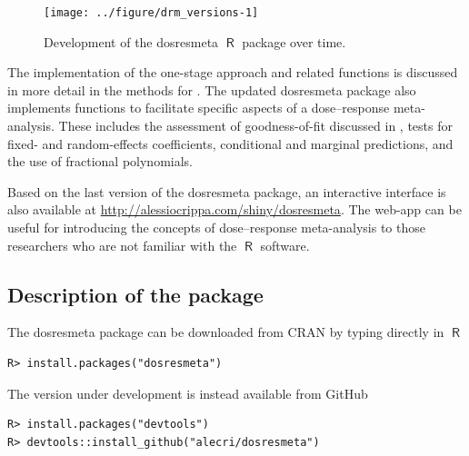 \documentclass[11pt,a4paper,twoside,openany]{book}\usepackage{knitr}
\newcommand{\pkg}[1]{{\fontseries{b}\selectfont #1}}
\DeclareMathOperator{\R}{\textsf{R}}
\begin{document}
{{\begin{knitrout}\footnotesize
{}\color{fgcolor}\begin{figure}[ht!]

{\centering \texttt{[image: ../figure/drm\_versions-1]} 

}

\caption[Development of the \pkg{dosresmeta} $\R$ package over time]{Development of the \pkg{dosresmeta} $\R$ package over time.}\label{fig:drm_versions}
\end{figure}


\end{knitrout}

\noindent The implementation of the one-stage approach and related functions is discussed in more detail in the methods for . 
The updated \pkg{dosresmeta} package also implements functions to facilitate specific aspects of a dose--response meta-analysis. These includes the assessment of goodness-of-fit discussed in , tests for fixed- and random-effects coefficients, conditional and marginal predictions, and the use of fractional polynomials.

Based on the last version of the \pkg{dosresmeta} package, an interactive interface is also available at \url{http://alessiocrippa.com/shiny/dosresmeta}. The web-app can be useful for introducing the concepts of dose--response meta-analysis to those researchers who are not familiar with the $\R$ software.

\subsection{Description of the package}

The \pkg{dosresmeta} package can be downloaded from CRAN by typing directly in $\R$
\begin{knitrout}\footnotesize
{}\color{fgcolor}\begin{kframe}
\begin{verbatim}
R> install.packages("dosresmeta")
\end{verbatim}
\end{kframe}
\end{knitrout}
\noindent The version under development is instead available from GitHub
\begin{knitrout}\footnotesize
{}\color{fgcolor}\begin{kframe}
\begin{verbatim}
R> install.packages("devtools")
R> devtools::install_github("alecri/dosresmeta")
\end{verbatim}
\end{kframe}
\end{knitrout}

}}
\end{document}
